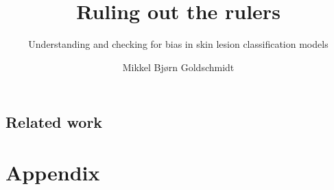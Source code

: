 \documentclass[11pt,a4paper,notitlepage]{report}
\title{Ruling out the rulers}
\subtitle{Understanding and checking for bias in skin lesion classification models}
\author{Mikkel Bjørn Goldschmidt}
\begin{document}
\maketitle

\tableofcontents
\pagebreak
\renewcommand{\chaptername}{Section} 

\renewcommand{\chaptername}{Section} 
\pagebreak


\chapter{Related work}


\pagebreak









\pagebreak
\listoffigures
\listoftables

\pagebreak
\printbibliography[title={Litterature}]
\pagebreak
\appendix
\part{Appendix}



\end{document}
